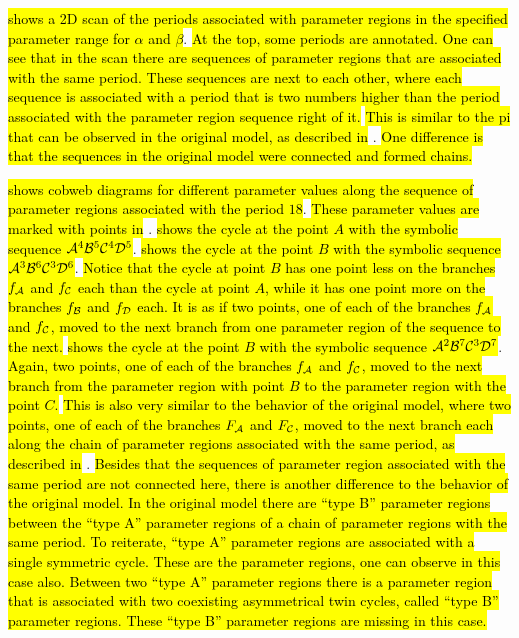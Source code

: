  \hl{shows a 2D scan of the periods associated with parameter regions in the specified parameter range for $\alpha$ and $\beta$}.
\hl{
	At the top, some periods are annotated.
	One can see that in the scan there are sequences of parameter regions that are associated with the same period.
	These sequences are next to each other, where each sequence is associated with a period that is two numbers higher than the period associated with the parameter region sequence right of it.
}
\hl{This is similar to the \gls{pi} that can be observed in the original model, as described in} .
\hl{
	One difference is that the sequences in the original model were connected and formed chains.
}

 \hl{shows cobweb diagrams for different parameter values along the sequence of parameter regions associated with the period $18$}.
\hl{These parameter values are marked with points in} .
 \hl{shows the cycle at the point $A$ with the symbolic sequence $\mathcal{A}^4\mathcal{B}^5\mathcal{C}^4\mathcal{D}^5$}.
 \hl{shows the cycle at the point $B$ with the symbolic sequence $\mathcal{A}^3\mathcal{B}^6\mathcal{C}^3\mathcal{D}^6$}.
\hl{
	Notice that the cycle at point $B$ has one point less on the branches $f_{\mathcal{A}}$ and $f_{\mathcal{C}}$ each than the cycle at point $A$, while it has one point more on the branches $f_{\mathcal{B}}$ and $f_{\mathcal{D}}$ each.
	It is as if two points, one of each of the branches $f_{\mathcal{A}}$ and $f_{\mathcal{C}}$, moved to the next branch from one parameter region of the sequence to the next.
}
 \hl{shows the cycle at the point $B$ with the symbolic sequence $\mathcal{A}^2\mathcal{B}^7\mathcal{C}^3\mathcal{D}^7$}.
\hl{
	Again, two points, one of each of the branches $f_{\mathcal{A}}$ and $f_{\mathcal{C}}$, moved to the next branch from the parameter region with point $B$ to the parameter region with the point $C$.
}
\hl{This is also very similar to the behavior of the original model, where two points, one of each of the branches $F_{\mathcal{A}}$ and $F_{\mathcal{C}}$, moved to the next branch each along the chain of parameter regions associated with the same period, as described in} .
\hl{
	Besides that the sequences of parameter region associated with the same period are not connected here, there is another difference to the behavior of the original model.
	In the original model there are ``type B'' parameter regions between the ``type A'' parameter regions of a chain of parameter regions with the same period.
	To reiterate, ``type A'' parameter regions are associated with a single symmetric cycle.
	These are the parameter regions, one can observe in this case also.
	Between two ``type A'' parameter regions there is a parameter region that is associated with two coexisting asymmetrical twin cycles, called ``type B'' parameter regions.
	These ``type B'' parameter regions are missing in this case.
}

